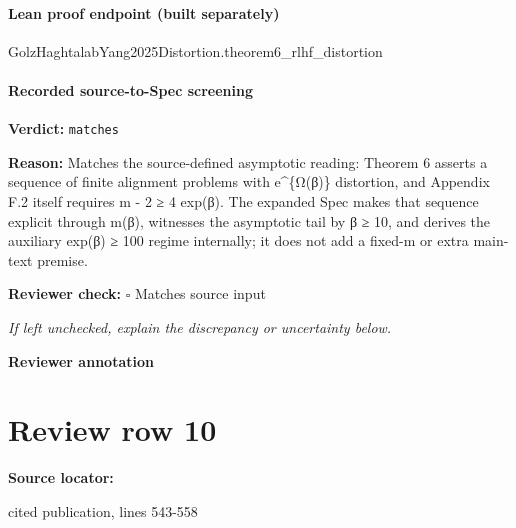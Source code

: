 \documentclass[10pt]{article}
\newcommand{\reviewerbox}{%
  \par\noindent\fbox{\parbox{0.96\linewidth}{\rule{0pt}{0.38in}}}\par
}
\newcommand{\reviewmatch}[1]{%
  \par\noindent\textbf{Reviewer check:} $\square$\; #1\par
  \noindent\emph{If left unchecked, explain the discrepancy or uncertainty below.}\par
}
\begin{document}
\paragraph{Lean proof endpoint (built separately)}\begin{ReviewVerbatim}
GolzHaghtalabYang2025Distortion.theorem6_rlhf_distortion
\end{ReviewVerbatim}

\paragraph{Recorded source-to-Spec screening}
\textbf{Verdict:} \texttt{matches}
\\
{\raggedright
\textbf{Reason:} Matches the source-\allowbreak{}defined asymptotic reading:\allowbreak{} Theorem 6 asserts a sequence of finite alignment problems with e\textasciicircum{}\{Ω(β)\} distortion, and Appendix F.\allowbreak{}2 itself requires m -\allowbreak{} 2 ≥ 4 exp(β).\allowbreak{} The expanded Spec makes that sequence explicit through m(β), witnesses the asymptotic tail by β ≥ 10, and derives the auxiliary exp(β) ≥ 100 regime internally;\allowbreak{} it does not add a fixed-\allowbreak{}m or extra main-\allowbreak{}text premise.\allowbreak{}
\par}
\reviewmatch{Matches source input}
\noindent\textbf{Reviewer annotation}\par
\reviewerbox
\clearpage
\hypertarget{source-claim-5067ef3ec8c43462}{}
\section*{Review row 10}
\textbf{Source locator:} {\footnotesize\raggedright cited publication, lines 543-\allowbreak{}558\par}
\end{document}
